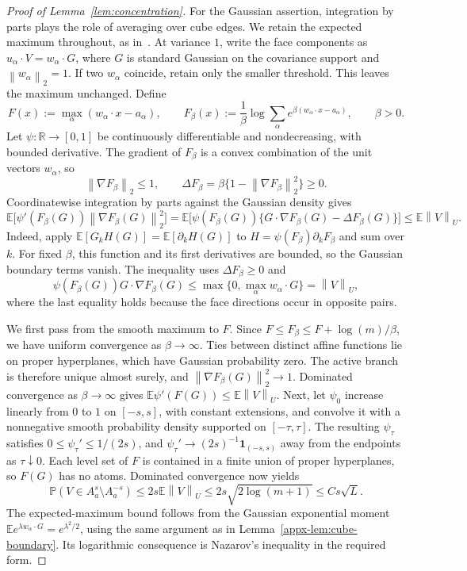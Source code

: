 \documentclass[11pt,letterpaper]{article}
\theoremstyle{remark}
\newcommand{\E}{\mathbb E}
\newcommand{\Pp}{\mathbb P}
\newcommand{\R}{\mathbb R}
\newcommand{\norm}[1]{\left\lVert#1\right\rVert}
\newcommand{\ind}{\mathbf 1}
\begin{document}
\begin{proof}[Proof of Lemma~\ref{lem:concentration}]
For the Gaussian assertion, integration by parts plays the role of
averaging over cube edges. We retain the expected maximum throughout,
as in~\cite{ChernozhukovAC2026}. At variance \(1\),
write the face components as \(u_\alpha\cdot V=w_\alpha\cdot G\),
where \(G\) is standard Gaussian on the covariance support and
\(\norm{w_\alpha}_2=1\). If two \(w_\alpha\) coincide, retain
only the smaller threshold. This leaves the maximum unchanged.
Define
\[
 F(x):=\max_\alpha(w_\alpha\cdot x-a_\alpha),\qquad
 F_\beta(x):=\frac1\beta\log\sum_\alpha
       e^{\beta(w_\alpha\cdot x-a_\alpha)},\qquad\beta>0.
\]
Let \(\psi:\R\to[0,1]\) be continuously differentiable and
nondecreasing, with bounded derivative. The gradient of \(F_\beta\)
is a convex combination of the unit vectors \(w_\alpha\), so
\[
 \norm{\nabla F_\beta}_2\le1,
 \qquad \Delta F_\beta
 =\beta\{1-\norm{\nabla F_\beta}_2^2\}\ge0.
\]
Coordinatewise integration by parts against the Gaussian density gives
\[
 \E\bigl[\psi'(F_\beta(G))\norm{\nabla F_\beta(G)}_2^2\bigr]
 =\E\bigl[\psi(F_\beta(G))
       \{G\cdot\nabla F_\beta(G)-\Delta F_\beta(G)\}\bigr]
 \le\E\norm{V}_U.
\]
Indeed, apply \(\E[G_kH(G)]=\E[\partial_kH(G)]\) to
\(H=\psi(F_\beta)\partial_kF_\beta\) and sum over \(k\).
For fixed \(\beta\), this function and its first derivatives are
bounded, so the Gaussian boundary terms vanish. The inequality uses
\(\Delta F_\beta\ge0\) and
\[
 \psi(F_\beta(G))G\cdot\nabla F_\beta(G)
 \le\max\{0,\max_\alpha w_\alpha\cdot G\}
 =\norm{V}_U,
\]
where the last equality holds because the face directions occur in
opposite pairs.

We first pass from the smooth maximum to \(F\). Since
\(F\le F_\beta\le F+\log(m)/\beta\), we have uniform convergence
as \(\beta\to\infty\). Ties between distinct
affine functions lie on proper hyperplanes, which have Gaussian
probability zero. The active branch is therefore unique almost surely,
and \(\norm{\nabla F_\beta(G)}_2^2\to1\). Dominated convergence
as \(\beta\to\infty\) gives
\(\E\psi'(F(G))\le\E\norm{V}_U\).
Next, let \(\psi_0\) increase linearly from \(0\) to \(1\) on
\([-s,s]\), with constant extensions, and convolve it with a
nonnegative smooth probability density supported on \([-\tau,\tau]\).
The resulting \(\psi_\tau\) satisfies \(0\le\psi_\tau'\le1/(2s)\),
and \(\psi_\tau'\to(2s)^{-1}\ind_{(-s,s)}\) away from the endpoints
as \(\tau\downarrow0\). Each level set of \(F\) is contained in
a finite union of proper hyperplanes, so \(F(G)\) has no atoms.
Dominated convergence now yields
\[
 \Pp(V\in A_a^s\setminus A_a^{-s})
 \le2s\E\norm{V}_U
 \le2s\sqrt{2\log(m+1)}\le Cs\sqrt L.
\]
The expected-maximum bound follows from the Gaussian exponential
moment \(\E e^{\lambda w_\alpha\cdot G}=e^{\lambda^2/2}\),
using the same argument as in Lemma~\ref{appx-lem:cube-boundary}.
Its logarithmic consequence is Nazarov's inequality
\cite{Nazarov2003,CCK17N} in the required form.


\end{proof}
\end{document}
